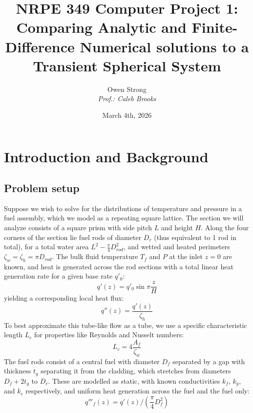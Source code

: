\documentclass[12pt]{article}
\title{NRPE 349 Computer Project 1: Comparing Analytic and Finite-Difference Numerical solutions to a Transient Spherical System}
\author{Owen Strong \\
\itshape Prof.: Caleb Brooks
}
\date{March 4th, 2026}
\begin{document}
\maketitle
\pagebreak
{\hypersetup{linkcolor=black}\tableofcontents}
\pagebreak
{}
\begin{abstract}
\end{abstract}

\section{Introduction and Background}
\subsection{Problem setup}
Suppose we wish to solve for the distributions of temperature and pressure in a fuel assembly, which we model as a repeating square lattice.
The section we will analyze consists of a square prism with side pitch $L$ and height $H$\cite{npre_npre_2026}.
Along the four corners of the section lie fuel rods of diameter $D_{r}$ (thus equivalent to 1 rod in total), for a total water area $L^2 - \frac{\pi}{4}D_{rod}^2$, and wetted and heated perimeters $\zeta_w=\zeta_h=\pi D_{rod}$.
The bulk fluid temperature $T_f$ and $P$ at the inlet $z=0$ are known, and heat is generated across the rod sections with a total linear heat generation rate for a given base rate $q'_0$:
\begin{equation}
    \label{eq:q_lin}
    q'(z) = q'_0\sin{\pi \frac{z}{H}}
\end{equation}
yielding a corresponding local heat flux:
\begin{equation}
    \label{eq:local_flux}
    q''(z) = \frac{q'(z)}{\zeta_h}
\end{equation}
To best approximate this tube-like flow as a tube, we use a specific characteristic length $L_c$ for properties like Reynolds and Nusselt numbers:
\begin{equation}
    \label{eq:lchar}
    L_c = 4\frac{A_f}{\zeta_w}
\end{equation}
The fuel rods consist of a central fuel with diameter $D_{f}$ separated by a gap with thickness $t_{g}$ separating it from the cladding, which stretches from diameters $D_f + 2t_g$ to $D_r$.
These are modelled as static, with known conductivities $k_f$, $k_g$, and $k_c$ respectively, and uniform heat generation across the fuel and the fuel only:
\begin{equation}
    \label{eq:fuel_gen}
    q'''_f(z) = q'(z) / (\frac{\pi}{4}D_f^2)
\end{equation}
\end{document}

